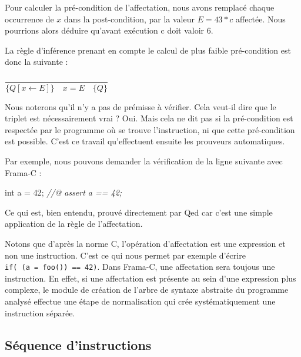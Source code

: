 \documentclass[12pt,francais,]{scrbook}
\newenvironment{Shaded}{}{}
\newcommand{\DataTypeTok}[1]{\textcolor[rgb]{0.56,0.13,0.00}{{#1}}}
\newcommand{\DecValTok}[1]{\textcolor[rgb]{0.25,0.63,0.44}{{#1}}}
\newcommand{\CommentTok}[1]{\textcolor[rgb]{0.38,0.63,0.69}{\textit{{#1}}}}
\newcommand{\NormalTok}[1]{{#1}}
\newenvironment{zdsblock}[1]{%
  \tcolorbox[beamer,%
    noparskip,breakable,
    colback=LightBlue,colframe=DarkBlue,%
    colbacklower=DarkBlue,%
    title=#1]
}{\endtcolorbox}
\begin{document}
Pour calculer la pré-condition de l'affectation, nous avons remplacé
chaque occurrence de \(x\) dans la post-condition, par la valeur
\(E = 43*c\) affectée. Nous pourrions alors déduire qu'avant exécution c
doit valoir 6.

La règle d'inférence prenant en compte le calcul de plus faible
pré-condition est donc la suivante :

\begin{center}
\(\dfrac{}{\{Q[x \leftarrow E] \}\quad x = E \quad\{ Q \}}\)
\end{center}

Nous noterons qu'il n'y a pas de prémisse à vérifier. Cela veut-il dire
que le triplet est nécessairement vrai ? Oui. Mais cela ne dit pas si la
pré-condition est respectée par le programme où se trouve l'instruction,
ni que cette pré-condition est possible. C'est ce travail qu'effectuent
ensuite les prouveurs automatiques.

Par exemple, nous pouvons demander la vérification de la ligne suivante
avec Frama-C :

\begin{footnotesize}\begin{Shaded}
\begin{Highlighting}[]
\DataTypeTok{int} \NormalTok{a = }\DecValTok{42}\NormalTok{;}
\CommentTok{//@ assert a == 42;}
\end{Highlighting}
\end{Shaded}\end{footnotesize}

Ce qui est, bien entendu, prouvé directement par Qed car c'est une
simple application de la règle de l'affectation.

\begin{zdsblock}{Information}
  Notons que d'après la norme C,
  l'opération d'affectation est une expression et non une
  instruction. C'est ce qui nous permet par exemple d'écrire
  \texttt{if(\ (a\ =\ foo())\ ==\ 42)}. Dans Frama-C, une affectation sera
  toujous une instruction. En effet, si une affectation est
  présente au sein d'une expression plus complexe, le module de
  création de l'arbre de syntaxe abstraite du programme analysé
  effectue une étape de normalisation qui crée systématiquement
  une instruction séparée.
\end{zdsblock}

\subsection{Séquence d'instructions}\label{suxe9quence-dinstructions}
\end{document}
